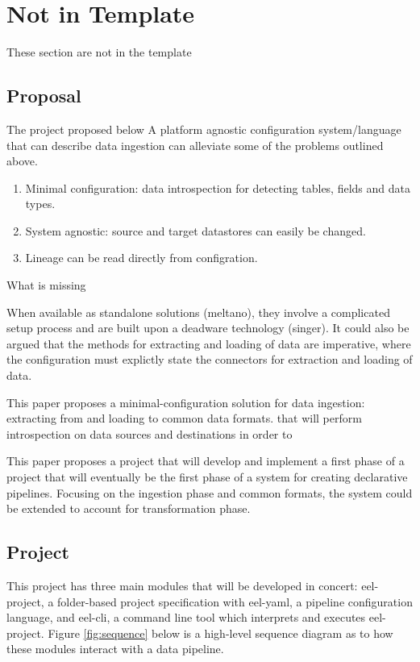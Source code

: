 \section{Not in Template}\label{not-in-template}

These section are not in the template

\subsection{Proposal}\label{proposal}

The project proposed below A platform agnostic configuration
system/language that can describe data ingestion can alleviate some of
the problems outlined above.

\begin{enumerate}
\def\labelenumi{\arabic{enumi}.}
\tightlist
\item
  Minimal configuration: data introspection for detecting tables, fields
  and data types.
\item
  System agnostic: source and target datastores can easily be changed.
\item
  Lineage can be read directly from configration.
\end{enumerate}

What is missing

When available as standalone solutions (meltano), they involve a
complicated setup process and are built upon a deadware technology
(singer). It could also be argued that the methods for extracting and
loading of data are imperative, where the configuration must explictly
state the connectors for extraction and loading of data.

This paper proposes a minimal-configuration solution for data ingestion:
extracting from and loading to common data formats. that will perform
introspection on data sources and destinations in order to

This paper proposes a project that will develop and implement a first
phase of a project that will eventually be the first phase of a system
for creating declarative pipelines. Focusing on the ingestion phase and
common formats, the system could be extended to account for
transformation phase.

\subsection{Project}\label{project}

This project has three main modules that will be developed in concert:
eel-project, a folder-based project specification with eel-yaml, a
pipeline configuration language, and eel-cli, a command line tool which
interprets and executes eel-project. Figure \ref{fig:sequence} below is
a high-level sequence diagram as to how these modules interact with a
data pipeline.

